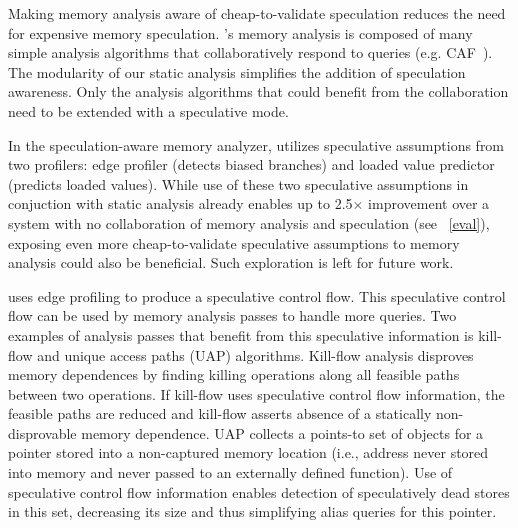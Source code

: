 %
%

Making memory analysis aware of cheap-to-validate speculation reduces the
need for expensive memory speculation.
\name's memory analysis is composed of many simple analysis algorithms
that collaboratively respond to queries (e.g.
CAF~\cite{johnson:cgo:17}).
%
The modularity of our static analysis simplifies the addition of
speculation awareness. Only the analysis algorithms that could
benefit from the collaboration need to be extended with a
speculative mode.
%

In the speculation-aware memory analyzer, \name utilizes speculative
assumptions from two profilers: edge profiler (detects biased
branches) and loaded value predictor (predicts loaded values).
%
While use of these two speculative assumptions in conjuction with
static analysis already enables up to 2.5$\times$ improvement over a
system with no collaboration of memory analysis and speculation (see
~\cref{eval}), exposing even more cheap-to-validate speculative
assumptions to memory analysis could also be beneficial.  Such
exploration is left for future work.

\name uses edge profiling to produce a speculative control flow. This
speculative control flow can be used by memory analysis passes to
handle more queries.
%
Two examples of analysis passes that benefit from this speculative
information is kill-flow and unique access paths (UAP) algorithms.
%
Kill-flow analysis disproves memory dependences by finding killing
operations along all feasible paths between two operations.  If
kill-flow uses speculative control flow information, the feasible
paths are reduced and kill-flow asserts absence of a statically
non-disprovable memory dependence.
%
UAP collects a points-to set of objects for a pointer stored into a
non-captured memory location (i.e., address never stored into memory
and never passed to an externally defined function).
Use of speculative control flow information enables detection of
speculatively dead stores in this set, decreasing its size and thus
simplifying alias queries for this pointer.


